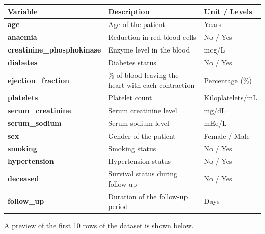 \documentclass[
  letterpaper,
  DIV=11,
  numbers=noendperiod]{scrartcl}
\begin{document}
\begin{longtable}[]{@{}
  >{\raggedright\arraybackslash}p{}
  >{\raggedright\arraybackslash}p{}
  >{\raggedright\arraybackslash}p{}@{}}
\toprule\noalign{}
\begin{minipage}[b]{\linewidth}\raggedright
Variable
\end{minipage} & \begin{minipage}[b]{\linewidth}\raggedright
Description
\end{minipage} & \begin{minipage}[b]{\linewidth}\raggedright
Unit / Levels
\end{minipage} \\
\midrule\noalign{}
\endhead
\bottomrule\noalign{}
\endlastfoot
\textbf{age} & Age of the patient & Years \\
\textbf{anaemia} & Reduction in red blood cells & No / Yes \\
\textbf{creatinine\_phosphokinase} & Enzyme level in the blood &
mcg/L \\
\textbf{diabetes} & Diabetes status & No / Yes \\
\textbf{ejection\_fraction} & \% of blood leaving the heart with each
contraction & Percentage (\%) \\
\textbf{platelets} & Platelet count & Kiloplatelets/mL \\
\textbf{serum\_creatinine} & Serum creatinine level & mg/dL \\
\textbf{serum\_sodium} & Serum sodium level & mEq/L \\
\textbf{sex} & Gender of the patient & Female / Male \\
\textbf{smoking} & Smoking status & No / Yes \\
\textbf{hypertension} & Hypertension status & No / Yes \\
\textbf{deceased} & Survival status during follow-up & No / Yes \\
\textbf{follow\_up} & Duration of the follow-up period & Days \\
\end{longtable}

A preview of the first 10 rows of the dataset is shown below.
\end{document}
